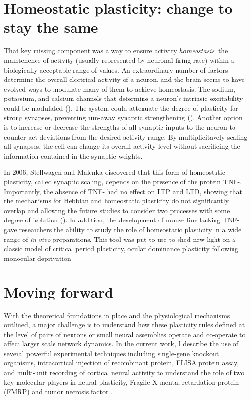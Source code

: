 \section{Homeostatic plasticity: change to stay the same}

That key missing component was a way to ensure activity \textit{homeostasis}, the maintenence of activity (usually represented by neuronal firing rate) within a biologically acceptable range of values. An extraordinary number of factors determine the overall electrical activity of a neuron, and the brain seems to have evolved ways to modulate many of them to achieve homeostasis. The sodium, potassium, and calcium channels that determine a neuron's intrinsic excitability could be modulated (\cite{Franklin1992}). The system could attenuate the degree of plasticity for strong synapses, preventing run-away synaptic strengthening (\cite{VanRossum2000}). Another option is to increase or decrease the strengths of all synaptic inputs to the neuron to counter-act deviations from the desired activity range. By multiplicitavely scaling all synapses, the cell can change its overall activity level without sacrificing the information contained in the synaptic weights.

In 2006, Stellwagen and Malenka discovered that this form of homeostatic plasticity, called synaptic scaling, depends on the presence of the protein TNF-\textalpha{}. Importantly, the absence of TNF-\textalpha{} had no effect on LTP and LTD, showing that the mechanisms for Hebbian and homeostatic plasticity do not significantly overlap and allowing the future studies to consider two processes with some degree of isolation (\cite{Stellwagen2006}). In addition, the development of mouse line lacking TNF-\textalpha{} gave researchers the ability to study the role of homeostatic plasticity in a wide range of \textit{in vivo} preparations. This tool was put to use to shed new light on a classic model of critical period plasticity, ocular dominance plasticity following monocular deprivation.

\section{Moving forward}

With the theoretical foundations in place and the physiological mechanisms outlined, a major challenge is to understand how these plasticity rules defined at the level of pairs of neurons or small neural assemblies operate and co-operate to affect larger scale network dynamics. In the current work, I describe the use of several powerful experimental techniques including single-gene knockout organisms, intracortical injection of recombinant protein, ELISA protein assay, and multi-unit recording of cortical neural activity to understand the role of two key molecular players in neural plasticity, Fragile X mental retardation protein (FMRP) and tumor necrosis factor \textalpha{}.

